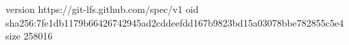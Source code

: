 version https://git-lfs.github.com/spec/v1
oid sha256:7fe1db1179b66426742945ad2cddeefdd167b9823bd15a03078bbe782855c5e4
size 258016
